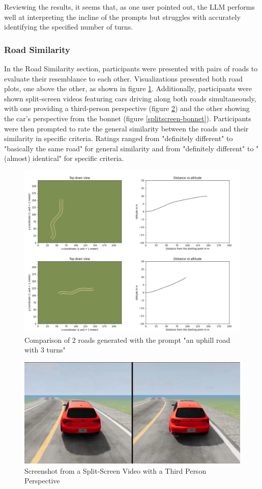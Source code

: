 Reviewing the results, it seems that, as one user pointed out, the LLM performs well at interpreting the incline of the prompts but struggles with accurately identifying the specified number of turns.

\subsubsection{Road Similarity}
In the Road Similarity section, participants were presented with pairs of roads to evaluate their resemblance to each other. Visualizations presented both road plots, one above the other, as shown in figure \ref{comparison_u3t}. Additionally, participants were shown split-screen videos featuring cars driving along both roads simultaneously, with one providing a third-person perspective (figure \ref{splitscreen-tp}) and the other showing the car's perspective from the bonnet (figure \ref{splitscreen-bonnet}). Participants were then prompted to rate the general similarity between the roads and their similarity in specific criteria. Ratings ranged from "definitely different" to "basically the same road" for general similarity and from "definitely different" to "(almost) identical" for specific criteria.

\begin{figure}[H]
    \centering
    \includegraphics[width=0.75\linewidth]{images/road1_road2.jpg}
    \caption{Comparison of 2 roads generated with the prompt "an uphill road with 3 turns"}
    \label{comparison_u3t}
\end{figure}

\begin{figure}[H]
    \centering
    \includegraphics[width=0.75\linewidth]{images/splitscreen_tp_view.jpg}
    \caption{Screenshot from a Split-Screen Video with a Third Person Perspective}
    \label{splitscreen-tp}
\end{figure}

